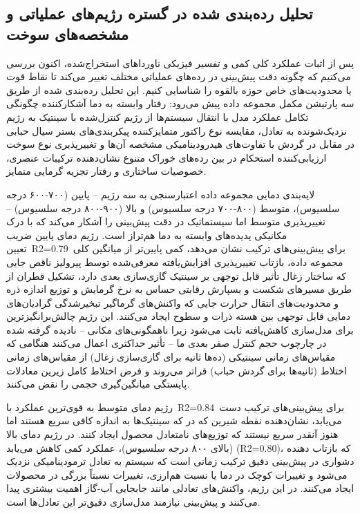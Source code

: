 \documentclass[12pt, a4paper]{article}
\begin{document}
\subsection{تحلیل رده‌بندی شده در گستره رژیم‌های عملیاتی و مشخصه‌های سوخت}

پس از اثبات عملکرد کلی کمی و تفسیر فیزیکی ناورداهای استخراج‌شده، اکنون بررسی می‌کنیم که چگونه دقت پیش‌بینی در رده‌های عملیاتی مختلف تغییر می‌کند تا نقاط قوت یا محدودیت‌های خاص حوزه بالقوه را شناسایی کنیم. این تحلیل رده‌بندی شده از طریق سه پارتیشن مکمل مجموعه داده پیش می‌رود: رفتار وابسته به دما آشکارکننده چگونگی تکامل عملکرد مدل با انتقال سیستم‌ها از رژیم کنترل‌شده با سینتیک به رژیم نزدیک‌شونده به تعادل، مقایسه نوع راکتور متمایزکننده پیکربندی‌های بستر سیال حبابی در مقابل در گردش با تفاوت‌های هیدرودینامیکی مشخصه آن‌ها و تغییرپذیری نوع سوخت ارزیابی‌کننده استحکام در بین رده‌های خوراک متنوع نشان‌دهنده ترکیبات عنصری، خصوصیات ساختاری و رفتار تجزیه گرمایی متمایز.

لایه‌بندی دمایی مجموعه داده اعتبارسنجی به سه رژیم – پایین (۷۰۰-۶۰۰ درجه سلسیوس)، متوسط (۸۰۰-۷۰۰ درجه سلسیوس) و بالا (۹۰۰-۸۰۰ درجه سلسیوس) – تغییرپذیری متوسط اما سیستماتیک در دقت پیش‌بینی را آشکار می‌کند که با درک مکانیکی پدیده‌های وابسته به دما هم‌تراز است. رژیم دمای پایین ضریب تعیین R2=0.79 برای پیش‌بینی‌های ترکیب نشان می‌دهد، کمی پایین‌تر از میانگین کلی مجموعه داده، بازتاب تغییرپذیری افزایش‌یافته معرفی‌شده توسط پیرولیز ناقص جایی که ساختار زغال تأثیر قابل توجهی بر سینتیک گازی‌سازی بعدی دارد، تشکیل قطران از طریق مسیرهای شکست و بسپارش رقابتی حساس به نرخ گرمایش و توزیع اندازه ذره و محدودیت‌های انتقال حرارت جایی که واکنش‌های گرماگیر تبخیرشدگی گرادیان‌های دمایی قابل توجهی بین هسته ذرات و سطوح ایجاد می‌کنند. این رژیم چالش‌برانگیزترین برای مدل‌سازی کاهش‌یافته ثابت می‌شود زیرا ناهمگونی‌های مکانی – نادیده گرفته شده در چارچوب حجم کنترل صفر بعدی ما – تأثیر حداکثری اعمال می‌کنند هنگامی که مقیاس‌های زمانی سینتیکی (ده‌ها ثانیه برای گازی‌سازی زغال) از مقیاس‌های زمانی اختلاط (ثانیه‌ها برای گردش حباب) فراتر می‌روند و فرض اختلاط کامل زیرین معادلات پایستگی میانگین‌گیری حجمی را نقض می‌کنند.

رژیم دمای متوسط به قوی‌ترین عملکرد با R2=0.84 برای پیش‌بینی‌های ترکیب دست می‌یابد، نشان‌دهنده نقطه شیرین که در که سینتیک‌ها به اندازه کافی سریع هستند اما هنوز آنقدر سریع نیستند که توزیع‌های نامتعادل محصول ایجاد کنند. در رژیم دمای بالا (بالای ۸۰۰ درجه سلسیوس)، عملکرد کمی کاهش می‌یابد (R2=0.80)، که بازتاب دهنده دشواری در پیش‌بینی دقیق ترکیب زمانی است که سیستم به تعادل ترمودینامیکی نزدیک می‌شود و تغییرات کوچک در دما یا نسبت هم‌ارزی، تغییرات نسبتاً بزرگی در محصولات ایجاد می‌کنند. در این رژیم، واکنش‌های تعادلی مانند جابجایی آب-گاز اهمیت بیشتری پیدا می‌کنند و پیش‌بینی نیازمند مدل‌سازی دقیق‌تر این تعادل‌ها است.
\end{document}
